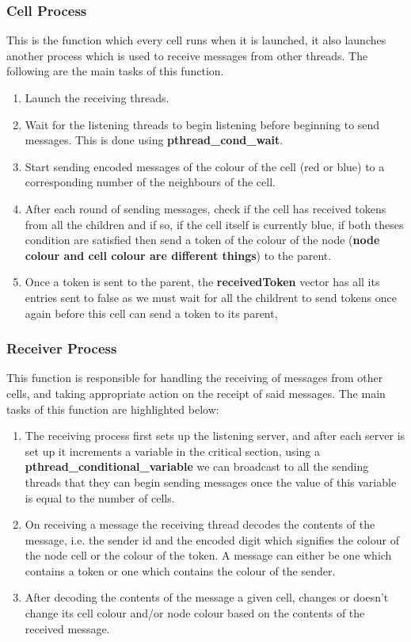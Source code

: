 \documentclass[a4paper,12pt]{report}
\begin{document}
\subsubsection{Cell Process}
This is the function which every cell runs when it is launched, it also launches another process which is used to receive messages from other threads. The following are the main tasks of this function.
\begin{enumerate}
\item Launch the receiving threads.
\item Wait for the listening threads to begin listening before beginning to send messages. This is done using \textbf{pthread\_cond\_wait}.
\item Start sending encoded messages of the colour of the cell (red or blue) to a corresponding number of the neighbours of the cell.
\item After each round of sending messages, check if the cell has received tokens from all the children and if so, if the cell itself is currently blue, if both theses condition are satisfied then send a token of the colour of the node (\textbf{node colour and cell colour are different things}) to the parent.
\item Once a token is sent to the parent, the \textbf{receivedToken} vector has all its entries sent to false as we must wait for all the childrent to send tokens once again before this cell can send a token to its parent,
\end{enumerate}
\subsubsection{Receiver Process}
This function is responsible for handling the receiving of messages from other cells, and taking appropriate action on the receipt of said messages.
The main tasks of this function are highlighted below:
\begin{enumerate}
\item The receiving process first sets up the listening server, and after each server is set up it increments a variable in the critical section, using  a \textbf{pthread\_conditional\_variable} we can broadcast to all the sending threads that they can begin sending messages once the value of this variable is equal to the number of cells.
\item On receiving a message the receiving thread decodes the contents of the message, i.e. the sender id and the encoded digit which signifies the colour of the node cell or the colour of the token. A message can either be one which contains a token or one which contains the colour of the sender.
\item After decoding the contents of the message a given cell, changes or doesn't change its cell colour and/or node colour based on the contents of the received message.
\end{enumerate}
\end{document}
